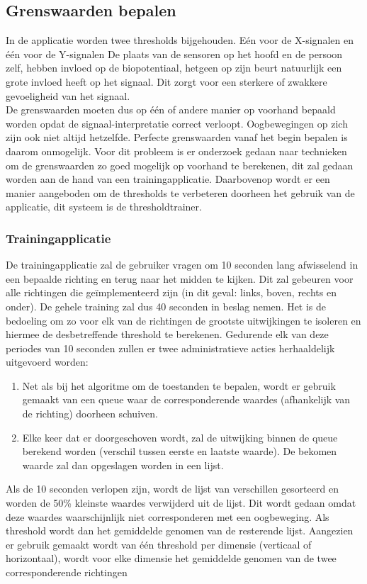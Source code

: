 \documentclass{article}
\begin{document}
\subsection{Grenswaarden bepalen}
In de applicatie worden twee thresholds bijgehouden. E\'en voor de X-signalen en \'e\'en voor de Y-signalen
De plaats van de sensoren op het hoofd en de persoon zelf, hebben invloed op de biopotentiaal, hetgeen op zijn beurt natuurlijk een grote invloed heeft op het signaal. Dit zorgt voor een sterkere of zwakkere gevoeligheid van het signaal.\\
De grenswaarden moeten dus op \'e\'en of andere manier op voorhand bepaald worden opdat de signaal-interpretatie correct verloopt. Oogbewegingen op zich zijn ook niet altijd hetzelfde. Perfecte grenswaarden vanaf het begin bepalen is daarom onmogelijk. Voor dit probleem is er onderzoek gedaan naar technieken om de grenswaarden zo goed mogelijk op voorhand te berekenen, dit zal gedaan worden aan de hand van een trainingapplicatie. Daarbovenop wordt er een manier aangeboden om de thresholds te verbeteren doorheen het gebruik van de applicatie, dit systeem is de thresholdtrainer.

\subsubsection{Trainingapplicatie}
\label{sec:training}
De trainingapplicatie zal de gebruiker vragen om 10 seconden lang afwisselend in een bepaalde richting  en terug naar het midden te kijken. Dit zal gebeuren voor alle richtingen die geïmplementeerd zijn (in dit geval: links, boven, rechts en onder).
De gehele training zal dus 40 seconden in beslag nemen. Het is de bedoeling om zo voor elk van de richtingen de grootste uitwijkingen te isoleren en hiermee de desbetreffende threshold te berekenen. Gedurende elk van deze periodes van 10 seconden zullen er twee administratieve acties herhaaldelijk uitgevoerd worden:
\begin{enumerate}
	\item Net als bij het algoritme om de toestanden te bepalen, wordt er gebruik gemaakt van een queue waar de corresponderende waardes (afhankelijk van de richting) doorheen schuiven.
	\item Elke keer dat er doorgeschoven wordt, zal de uitwijking binnen de queue berekend worden (verschil tussen eerste en laatste waarde). De bekomen waarde zal dan opgeslagen worden in een lijst.
\end{enumerate}
Als de 10 seconden verlopen zijn, wordt de lijst van verschillen gesorteerd en worden de 50\% kleinste waardes verwijderd uit de lijst. Dit wordt gedaan omdat deze waardes waarschijnlijk niet corresponderen met een oogbeweging. Als threshold wordt dan het gemiddelde genomen van de resterende lijst. Aangezien er gebruik gemaakt wordt van \'e\'en threshold per dimensie (verticaal of horizontaal), wordt voor elke dimensie het gemiddelde genomen van de twee corresponderende richtingen 
\end{document}
